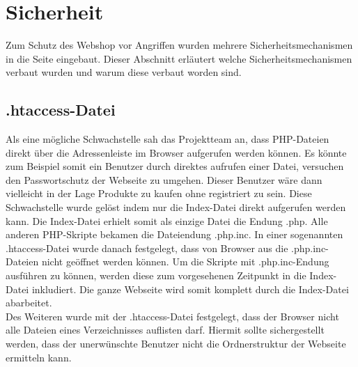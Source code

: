 \newpage
\section{Sicherheit}
Zum Schutz des Webshop vor Angriffen wurden mehrere Sicherheitsmechanismen in die Seite eingebaut. Dieser Abschnitt erläutert welche Sicherheitsmechanismen verbaut wurden und warum diese verbaut worden sind.

\subsection{\glqq .htaccess\grqq{}-Datei}
Als eine mögliche Schwachstelle sah das Projektteam an, dass PHP-Dateien direkt über die Adressenleiste im Browser aufgerufen werden können. Es könnte zum Beispiel somit ein Benutzer durch direktes aufrufen einer Datei, versuchen den Passwortschutz der Webseite zu umgehen. Dieser Benutzer wäre dann vielleicht in der Lage Produkte zu kaufen ohne registriert zu sein. Diese Schwachstelle wurde gelöst indem nur die Index-Datei direkt aufgerufen werden kann. Die Index-Datei erhielt somit als einzige Datei die Endung \glqq *.php\grqq{}. Alle anderen PHP-Skripte bekamen die Dateiendung \glqq *.php.inc\grqq{}. In einer sogenannten \glqq .htaccess\grqq{}-Datei wurde danach festgelegt, dass von Browser aus die \glqq *.php.inc\grqq{}-Dateien nicht geöffnet werden können. Um die Skripte mit \glqq *.php.inc\grqq{}-Endung ausführen zu können, werden diese zum vorgesehenen Zeitpunkt in die Index-Datei inkludiert. Die ganze Webseite wird somit komplett durch die Index-Datei abarbeitet.\\
Des Weiteren wurde mit der \glqq .htaccess\grqq{}-Datei festgelegt, dass der Browser nicht alle Dateien eines Verzeichnisses auflisten darf. Hiermit sollte sichergestellt werden, dass der unerwünschte Benutzer nicht die Ordnerstruktur der Webseite ermitteln kann.

